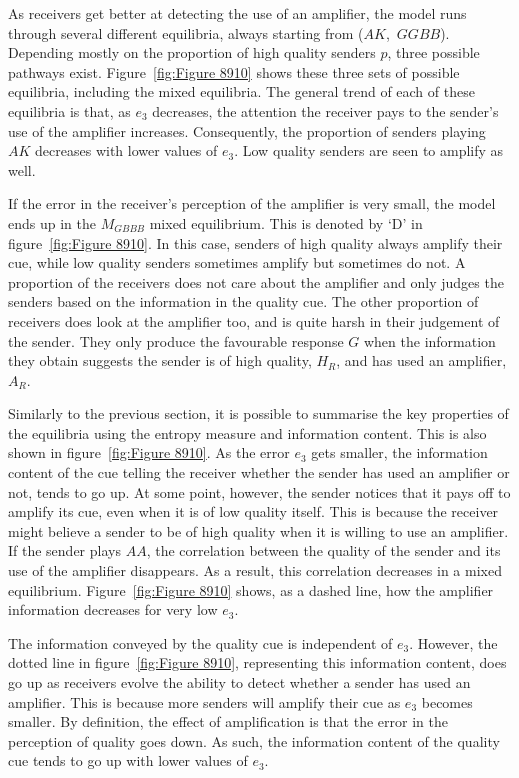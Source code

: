 \documentclass[a4paper,12pt]{article}
\numberwithin{equation}{section}
\begin{document}
As receivers get better at detecting the use of an amplifier, the model runs through several different equilibria, always starting from ($AK$,~$GGBB$). Depending mostly on the proportion of high quality senders $p$, three possible pathways exist. Figure~\ref{fig:Figure 8910} shows these three sets of possible equilibria, including the mixed equilibria. The general trend of each of these equilibria is that, as $e_{3}$ decreases, the attention the receiver pays to the sender's use of the amplifier increases. Consequently, the proportion of senders playing $AK$ decreases with lower values of $e_{3}$. Low quality senders are seen to amplify as well.

If the error in the receiver's perception of the amplifier is very small, the model ends up in the $M_{GBBB}$ mixed equilibrium. This is denoted by `D' in figure~\ref{fig:Figure 8910}. In this case, senders of high quality always amplify their cue, while low quality senders sometimes amplify but sometimes do not. A proportion of the receivers does not care about the amplifier and only judges the senders based on the information in the quality cue. The other proportion of receivers does look at the amplifier too, and is quite harsh in their judgement of the sender. They only produce the favourable response $G$ when the information they obtain suggests the sender is of high quality, $H_{R}$, and has used an amplifier, $A_{R}$.

Similarly to the previous section, it is possible to summarise the key properties of the equilibria using the entropy measure and information content. This is also shown in figure~\ref{fig:Figure 8910}. As the error $e_{3}$ gets smaller, the information content of the cue telling the receiver whether the sender has used an amplifier or not, tends to go up. At some point, however, the sender notices that it pays off to amplify its cue, even when it is of low quality itself. This is because the receiver might believe a sender to be of high quality when it is willing to use an amplifier. If the sender plays $AA$, the correlation between the quality of the sender and its use of the amplifier disappears. As a result, this correlation decreases in a mixed equilibrium. Figure~\ref{fig:Figure 8910} shows, as a dashed line, how the amplifier information decreases for very low $e_{3}$.

The information conveyed by the quality cue is independent of $e_{3}$. However, the dotted line in figure~\ref{fig:Figure 8910}, representing this information content, does go up as receivers evolve the ability to detect whether a sender has used an amplifier. This is because more senders will amplify their cue as $e_{3}$ becomes smaller. By definition, the effect of amplification is that the error in the perception of quality goes down. As such, the information content of the quality cue tends to go up with lower values of $e_{3}$.
\end{document}
